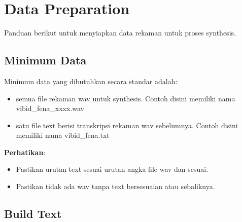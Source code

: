 \documentclass[12pt,]{article}
\begin{document}
	\newpage
	\mbox{}
	
	\newpage
	\section{Data Preparation}
	
	Panduan berikut untuk menyiapkan data rekaman untuk proses synthesis.
	
	\subsection{Minimum Data}
	
	Minimum data yang dibutuhkan secara standar adalah:
	\begin{itemize}
		\item semua file rekaman wav untuk synthesis. 
		Contoh disini memiliki nama vibid\_fena\_xxxx.wav
		
		\item satu file text berisi transkripsi rekaman wav sebelumnya.
		Contoh disini memiliki nama vibid\_fena.txt
	\end{itemize}

	\textbf{Perhatikan}:
	\begin{itemize}
		\item Pastikan urutan text sesuai urutan angka file wav dan sesuai.
		\item Pastikan tidak ada wav tanpa text bersesuaian atau sebaliknya.
	\end{itemize}

	\subsection{Build Text}
	
\end{document}
